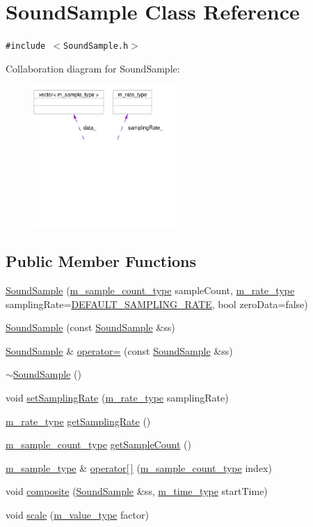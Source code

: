 \hypertarget{classSoundSample}{
\section{Sound\-Sample Class Reference}
\label{classSoundSample}
}
{\tt \#include $<$Sound\-Sample.h$>$}

Collaboration diagram for Sound\-Sample:\begin{figure}[H]
\begin{center}
\leavevmode
\includegraphics[width=155pt]{classSoundSample__coll__graph}
\end{center}
\end{figure}
\subsection*{Public Member Functions}
\begin{CompactItemize}
\item 
\hyperlink{classSoundSample_a0}{Sound\-Sample} (\hyperlink{Types_8h_a1}{m\_\-sample\_\-count\_\-type} sample\-Count, \hyperlink{Types_8h_a4}{m\_\-rate\_\-type} sampling\-Rate=\hyperlink{Types_8h_a5}{DEFAULT\_\-SAMPLING\_\-RATE}, bool zero\-Data=false)
\item 
\hyperlink{classSoundSample_a1}{Sound\-Sample} (const  \hyperlink{classSoundSample}{Sound\-Sample} \&ss)
\item 
\hyperlink{classSoundSample}{Sound\-Sample} \& \hyperlink{classSoundSample_a2}{operator=} (const  \hyperlink{classSoundSample}{Sound\-Sample} \&ss)
\item 
\hyperlink{classSoundSample_a3}{$\sim$Sound\-Sample} ()
\item 
void \hyperlink{classSoundSample_a4}{set\-Sampling\-Rate} (\hyperlink{Types_8h_a4}{m\_\-rate\_\-type} sampling\-Rate)
\item 
\hyperlink{Types_8h_a4}{m\_\-rate\_\-type} \hyperlink{classSoundSample_a5}{get\-Sampling\-Rate} ()
\item 
\hyperlink{Types_8h_a1}{m\_\-sample\_\-count\_\-type} \hyperlink{classSoundSample_a6}{get\-Sample\-Count} ()
\item 
\hyperlink{Types_8h_a0}{m\_\-sample\_\-type} \& \hyperlink{classSoundSample_a7}{operator\mbox{[}$\,$\mbox{]}} (\hyperlink{Types_8h_a1}{m\_\-sample\_\-count\_\-type} index)
\item 
void \hyperlink{classSoundSample_a8}{composite} (\hyperlink{classSoundSample}{Sound\-Sample} \&ss, \hyperlink{Types_8h_a2}{m\_\-time\_\-type} start\-Time)
\item 
void \hyperlink{classSoundSample_a9}{scale} (\hyperlink{Types_8h_a3}{m\_\-value\_\-type} factor)
\end{CompactItemize}
